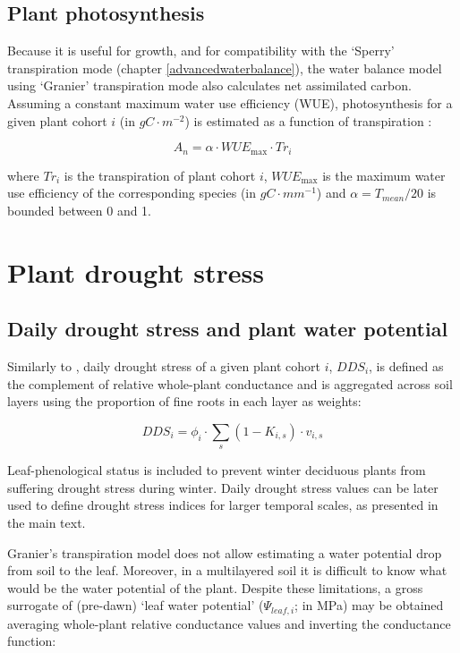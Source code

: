 \documentclass[]{book}
\begin{document}
\subsection{Plant photosynthesis}\label{plant-photosynthesis}

Because it is useful for growth, and for compatibility with the `Sperry'
transpiration mode (chapter \ref{advancedwaterbalance}), the water
balance model using `Granier' transpiration mode also calculates net
assimilated carbon. Assuming a constant maximum water use efficiency
(WUE), photosynthesis for a given plant cohort \(i\) (in
\(g C \cdot m^{-2}\)) is estimated as a function of transpiration
\citep{Mouillot2001}:

\begin{equation}
A_n = \alpha \cdot WUE_{\max} \cdot Tr_i
\end{equation}

where \(Tr_i\) is the transpiration of plant cohort \(i\),
\(WUE_{\max}\) is the maximum water use efficiency of the corresponding
species (in \(g C \cdot mm^{-1}\)) and \(\alpha = T_{mean}/20\) is
bounded between 0 and 1.

\section{Plant drought stress}\label{plant-drought-stress}

\subsection{Daily drought stress and plant water
potential}\label{daily-drought-stress-and-plant-water-potential}

Similarly to \citet{Mouillot2002}, daily drought stress of a given plant
cohort \(i\), \(DDS_i\), is defined as the complement of relative
whole-plant conductance and is aggregated across soil layers using the
proportion of fine roots in each layer as weights:

\begin{equation}
DDS_i=\phi_i \cdot \sum_{s}{(1-K_{i,s})\cdot v_{i,s}}
\end{equation}

Leaf-phenological status is included to prevent winter deciduous plants
from suffering drought stress during winter. Daily drought stress values
can be later used to define drought stress indices for larger temporal
scales, as presented in the main text.

Granier's transpiration model does not allow estimating a water
potential drop from soil to the leaf. Moreover, in a multilayered soil
it is difficult to know what would be the water potential of the plant.
Despite these limitations, a gross surrogate of (pre-dawn) `leaf water
potential' (\(\Psi_{leaf,i}\); in MPa) may be obtained averaging
whole-plant relative conductance values and inverting the conductance
function:
\end{document}
